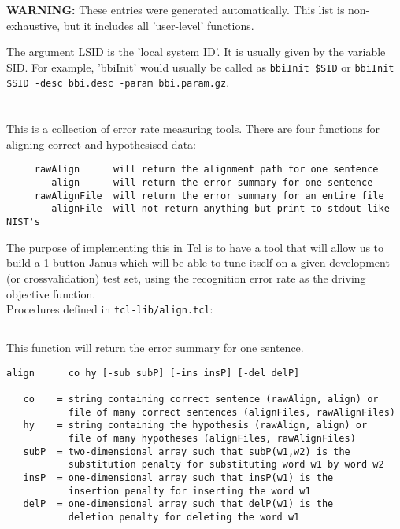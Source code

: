 \textbf{WARNING:} These entries were generated automatically.
This list is non-exhaustive, but it includes all 'user-level' functions.

The argument LSID is the 'local system ID'. It is usually
given by the variable SID. For example,
'bbiInit' would usually be called as \texttt{bbiInit \$SID}
or \texttt{bbiInit \$SID -desc bbi.desc -param bbi.param.gz}.

\section{}

This is a collection of error rate measuring tools.
There are four functions for aligning correct and hypothesised data:

\begin{verbatim}
     rawAlign      will return the alignment path for one sentence
        align      will return the error summary for one sentence
     rawAlignFile  will return the error summary for an entire file
        alignFile  will not return anything but print to stdout like NIST's
\end{verbatim}

The purpose of implementing this in Tcl is to have a tool that will allow
us to build a 1-button-Janus which will be able to tune itself on a given
development (or crossvalidation) test set, using the recognition error rate
as the driving objective function.\\

Procedures defined in \texttt{tcl-lib/align.tcl}:

  \subsection{}

    This function will return the error summary for one sentence.

\begin{verbatim}
align      co hy [-sub subP] [-ins insP] [-del delP]

   co    = string containing correct sentence (rawAlign, align) or
           file of many correct sentences (alignFiles, rawAlignFiles)
   hy    = string containing the hypothesis (rawAlign, align) or
           file of many hypotheses (alignFiles, rawAlignFiles)
   subP  = two-dimensional array such that subP(w1,w2) is the
           substitution penalty for substituting word w1 by word w2
   insP  = one-dimensional array such that insP(w1) is the
           insertion penalty for inserting the word w1
   delP  = one-dimensional array such that delP(w1) is the
           deletion penalty for deleting the word w1
\end{verbatim}

